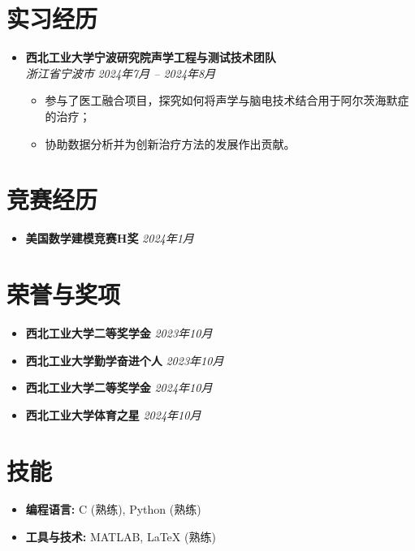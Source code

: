 \documentclass[a4paper,10pt]{article}
\begin{document}
\section*{实习经历}
\begin{itemize}[leftmargin=0.5cm]
	\item \textbf{西北工业大学宁波研究院声学工程与测试技术团队} \\ 
	\textit{浙江省宁波市} \hfill \textit{2024年7月 -- 2024年8月} 
	
	\begin{itemize}
		\item 参与了医工融合项目，探究如何将声学与脑电技术结合用于阿尔茨海默症的治疗；
		\item 协助数据分析并为创新治疗方法的发展作出贡献。
	\end{itemize}
\end{itemize}

\section*{竞赛经历}
\begin{itemize}[leftmargin=0.5cm]
    \item \textbf{美国数学建模竞赛H奖} \hfill \textit{2024年1月}
\end{itemize}

\section*{荣誉与奖项}
\begin{itemize}[leftmargin=0.5cm]
    \item \textbf{西北工业大学二等奖学金} \hfill \textit{2023年10月} 
    \item \textbf{西北工业大学勤学奋进个人} \hfill \textit{2023年10月} 
    \item \textbf{西北工业大学二等奖学金} \hfill \textit{2024年10月}
    \item \textbf{西北工业大学体育之星} \hfill \textit{2024年10月}
\end{itemize}

\section*{技能}
\begin{itemize}[leftmargin=0.5cm]
    \item \textbf{编程语言:} C (熟练), Python (熟练)
    \item \textbf{工具与技术:} MATLAB, LaTeX (熟练)
\end{itemize}
\end{document}
